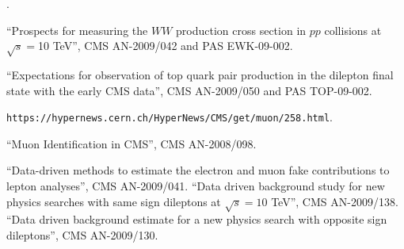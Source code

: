 \begin{thebibliography}{99}

.

 {``Prospects for measuring the $WW$ production cross section in $pp$ collisions at $\sqrt s = $10 TeV''}, CMS AN-2009/042 and PAS EWK-09-002.

 {``Expectations for observation of top quark pair production in the dilepton final state with the early CMS data''}, CMS AN-2009/050 and PAS TOP-09-002.

 {\tt https://hypernews.cern.ch/HyperNews/CMS/get/muon/258.html}.

 {``Muon Identification in CMS''}, CMS AN-2008/098.

 {``Data-driven methods to estimate the electron and muon fake contributions to lepton analyses''}, CMS AN-2009/041.
 {``Data driven background study for new physics searches with same sign dileptons at $\sqrt{s} = 10 $ TeV''}, CMS AN-2009/138.
 {``Data driven background estimate for a new physics search with opposite sign dileptons''}, CMS AN-2009/130.


\end{thebibliography}








